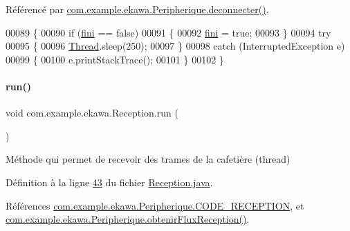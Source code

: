 Référencé par \hyperlink{_peripherique_8java_source_l00150}{com.\+example.\+ekawa.\+Peripherique.\+deconnecter()}.


\begin{DoxyCode}
00089     \{
00090         \textcolor{keywordflow}{if} (\hyperlink{classcom_1_1example_1_1ekawa_1_1_reception_a10e50f0a5152056cf0c79c53bfa01cc9}{fini} == \textcolor{keyword}{false})
00091         \{
00092             \hyperlink{classcom_1_1example_1_1ekawa_1_1_reception_a10e50f0a5152056cf0c79c53bfa01cc9}{fini} = \textcolor{keyword}{true};
00093         \}
00094         \textcolor{keywordflow}{try}
00095         \{
00096             \hyperlink{class_thread}{Thread}.sleep(250);
00097         \}
00098         \textcolor{keywordflow}{catch} (InterruptedException e)
00099         \{
00100             e.printStackTrace();
00101         \}
00102     \}
\end{DoxyCode}
\mbox{\label{classcom_1_1example_1_1ekawa_1_1_reception_ae5731cf974df539d32bfaded7b29d3c0}} 
\paragraph{\texorpdfstring{run()}{run()}}
{\footnotesize\ttfamily void com.\+example.\+ekawa.\+Reception.\+run (\begin{DoxyParamCaption}{ }\end{DoxyParamCaption})}



Méthode qui permet de recevoir des trames de la cafetière (thread) 



Définition à la ligne \hyperlink{_reception_8java_source_l00043}{43} du fichier \hyperlink{_reception_8java_source}{Reception.\+java}.



Références \hyperlink{_peripherique_8java_source_l00034}{com.\+example.\+ekawa.\+Peripherique.\+C\+O\+D\+E\+\_\+\+R\+E\+C\+E\+P\+T\+I\+ON}, et \hyperlink{_peripherique_8java_source_l00252}{com.\+example.\+ekawa.\+Peripherique.\+obtenir\+Flux\+Reception()}.


